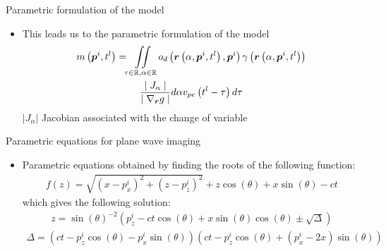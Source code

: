 {\begin{block}{Parametric formulation of the model}
\begin{itemize}
\begin{equation}
	\vec{r} = \left[x, z\right]^T \in \Gamma \left(\vec{p}^i, t \right) \Leftrightarrow \vec{r}\left(\alpha, \vec{p}^i, t\right)= \left[\alpha, f\left(\alpha, \vec{p}^i, t \right)\right]^T, \; \alpha \in \R
	\end{equation}
	\item This leads us to the parametric formulation of the model
	\begin{multline}
	\label{eq_inv_problem_cont_domain_parameterized}
	m\left(\bm{p}^i, t^l\right) = \iint \limits_{\tau \in \mathbb{R}, \alpha \in \mathbb{R}} o_d\left(\bm{r}\left(\alpha, \bm{p}^i, t^l\right), \bm{p}^i\right)\gamma \left(\bm{r}\left(\alpha, \bm{p}^i, t^l\right)\right) \\ \frac{\mid J_\alpha \mid}{\mid \nabla_{\bm{r}} g \mid} d\alpha v_{pe} \left(t^l - \tau\right) d \tau
	\end{multline}
	$|J_\alpha|$ Jacobian associated with the change of variable
\end{itemize}	
\end{block}
\vfill
\begin{block}{Parametric equations for plane wave imaging}
	\begin{itemize}
		\item Parametric equations obtained by finding the roots of the following function:
		\begin{align}
		f \left(z\right) = \sqrt{\left(x-p^i_x\right)^2 + \left(z-p^i_z\right)^2} + z \cos\left(\theta\right)  + x \sin\left(\theta\right) - ct
		\end{align}
		which gives the following solution:
		\begin{align}
		z = \sin \left(\theta\right)^{-2} \left(p^i_z - ct \cos \left(\theta\right) + x \sin \left(\theta\right) \cos \left(\theta\right) \pm \sqrt{\Delta} \right)
		\end{align}
		\begin{align*}
		\Delta = \left(ct-p^i_z \cos \left(\theta\right) - p^i_x \sin \left(\theta\right) \right)\left(ct-p^i_z \cos \left(\theta\right) + \left(p^i_x -2 x\right) \sin \left(\theta\right) \right)
		\end{align*}
	\end{itemize}
\end{block}
}
